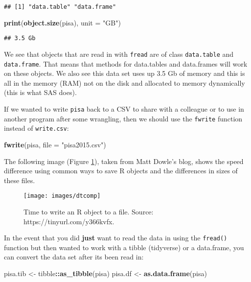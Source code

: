 \documentclass[]{book}
\newenvironment{Shaded}{\begin{snugshade}}{\end{snugshade}}
\newcommand{\DataTypeTok}[1]{\textcolor[rgb]{0.13,0.29,0.53}{#1}}
\newcommand{\KeywordTok}[1]{\textcolor[rgb]{0.13,0.29,0.53}{\textbf{#1}}}
\newcommand{\NormalTok}[1]{#1}
\newcommand{\OperatorTok}[1]{\textcolor[rgb]{0.81,0.36,0.00}{\textbf{#1}}}
\newcommand{\StringTok}[1]{\textcolor[rgb]{0.31,0.60,0.02}{#1}}
\begin{document}
\begin{verbatim}
## [1] "data.table" "data.frame"
\end{verbatim}

\begin{Shaded}
\begin{Highlighting}[]
\KeywordTok{print}\NormalTok{(}\KeywordTok{object.size}\NormalTok{(pisa), }\DataTypeTok{unit =} \StringTok{"GB"}\NormalTok{)}
\end{Highlighting}
\end{Shaded}

\begin{verbatim}
## 3.5 Gb
\end{verbatim}

We see that objects that are read in with \texttt{fread} are of class \texttt{data.table} and \texttt{data.frame}. That means that methods for data.tables and data.frames will work on these objects. We also see this data set uses up 3.5 Gb of memory and this is all in the memory (RAM) not on the disk and allocated to memory dynamically (this is what SAS does).

If we wanted to write \texttt{pisa} back to a CSV to share with a colleague or to use in another program after some wrangling, then we should use the \texttt{fwrite} function instead of \texttt{write.csv}:

\begin{Shaded}
\begin{Highlighting}[]
\KeywordTok{fwrite}\NormalTok{(pisa, }\DataTypeTok{file =} \StringTok{"pisa2015.csv"}\NormalTok{)}
\end{Highlighting}
\end{Shaded}

The following image (Figure \ref{fig:dtcomp}), taken from Matt Dowle's blog, shows the speed difference using common ways to save R objects and the differences in sizes of these files.

\begin{figure}
\texttt{[image: images/dtcomp]} \caption{Time to write an R object to a file. Source: https://tinyurl.com/y366kvfx.}\label{fig:dtcomp}
\end{figure}

In the event that you did \textbf{just} want to read the data in using the \texttt{fread()} function but then wanted to work with a tibble (tidyverse) or a data.frame, you can convert the data set after its been read in:

\begin{Shaded}
\begin{Highlighting}[]
\NormalTok{pisa.tib <-}\StringTok{ }\NormalTok{tibble}\OperatorTok{::}\KeywordTok{as_tibble}\NormalTok{(pisa)}
\NormalTok{pisa.df <-}\StringTok{ }\KeywordTok{as.data.frame}\NormalTok{(pisa)}
\end{Highlighting}
\end{Shaded}
\end{document}
